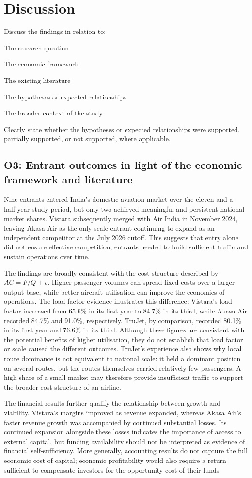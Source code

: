 \documentclass[12pt,a4paper]{article}
\newenvironment{o3box}{\ifthenelse{\boolean{o3highlight}}{\begingroup\color{o3sky}}{}}{\ifthenelse{\boolean{o3highlight}}{\endgroup}{}}
\newcommand{\templatebullet}[1]{\par\noindent\textbullet\hspace{5.88pt}#1\par}
\begin{document}
\section{Discussion}
Discuss the findings in relation to:
\templatebullet{The research question}
\templatebullet{The economic framework}
\templatebullet{The existing literature}
\templatebullet{The hypotheses or expected relationships}
\templatebullet{The broader context of the study}
Clearly state whether the hypotheses or expected relationships were supported, partially supported, or not supported, where applicable.

\begin{o3box}
\subsection{O3: Entrant outcomes in light of the economic framework and literature}

Nine entrants entered India's domestic aviation market over the eleven-and-a-half-year study period, but only two achieved meaningful and persistent national market shares. Vistara subsequently merged with Air India in November 2024, leaving Akasa Air as the only scale entrant continuing to expand as an independent competitor at the July 2026 cutoff. This suggests that entry alone did not ensure effective competition; entrants needed to build sufficient traffic and sustain operations over time.

The findings are broadly consistent with the cost structure described by $AC=F/Q+v$. Higher passenger volumes can spread fixed costs over a larger output base, while better aircraft utilisation can improve the economics of operations. The load-factor evidence illustrates this difference: Vistara's load factor increased from 65.6\% in its first year to 84.7\% in its third, while Akasa Air recorded 84.7\% and 91.0\%, respectively. TruJet, by comparison, recorded 80.1\% in its first year and 76.6\% in its third. Although these figures are consistent with the potential benefits of higher utilisation, they do not establish that load factor or scale caused the different outcomes. TruJet's experience also shows why local route dominance is not equivalent to national scale: it held a dominant position on several routes, but the routes themselves carried relatively few passengers. A high share of a small market may therefore provide insufficient traffic to support the broader cost structure of an airline.

The financial results further qualify the relationship between growth and viability. Vistara's margins improved as revenue expanded, whereas Akasa Air's faster revenue growth was accompanied by continued substantial losses. Its continued expansion alongside these losses indicates the importance of access to external capital, but funding availability should not be interpreted as evidence of financial self-sufficiency. More generally, accounting results do not capture the full economic cost of capital; economic profitability would also require a return sufficient to compensate investors for the opportunity cost of their funds.


\end{o3box}
\end{document}
